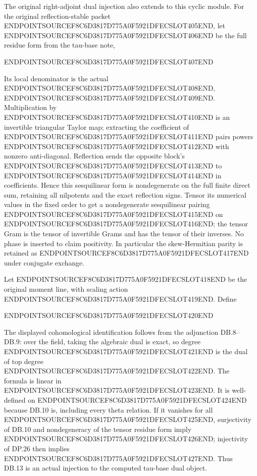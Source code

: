 The original right-adjoint dual injection also extends to this cyclic module. For the original reflection-stable packet ENDPOINTSOURCEF8C6D3817D775A0F5921DFECSLOT405END, let ENDPOINTSOURCEF8C6D3817D775A0F5921DFECSLOT406END be the full residue form from the tau-base note,

ENDPOINTSOURCEF8C6D3817D775A0F5921DFECSLOT407END

Its local denominator is the actual ENDPOINTSOURCEF8C6D3817D775A0F5921DFECSLOT408END, ENDPOINTSOURCEF8C6D3817D775A0F5921DFECSLOT409END. Multiplication by ENDPOINTSOURCEF8C6D3817D775A0F5921DFECSLOT410END is an invertible triangular Taylor map; extracting the coefficient of ENDPOINTSOURCEF8C6D3817D775A0F5921DFECSLOT411END pairs powers ENDPOINTSOURCEF8C6D3817D775A0F5921DFECSLOT412END with nonzero anti-diagonal. Reflection sends the opposite block's ENDPOINTSOURCEF8C6D3817D775A0F5921DFECSLOT413END to ENDPOINTSOURCEF8C6D3817D775A0F5921DFECSLOT414END in coefficients. Hence this sesquilinear form is nondegenerate on the full finite direct sum, retaining all nilpotents and the exact reflection signs. Tensor its numerical values in the fixed order to get a nondegenerate sesquilinear pairing ENDPOINTSOURCEF8C6D3817D775A0F5921DFECSLOT415END on ENDPOINTSOURCEF8C6D3817D775A0F5921DFECSLOT416END; the tensor Gram is the tensor of invertible Grams and has the tensor of their inverses. No phase is inserted to claim positivity. In particular the skew-Hermitian parity is retained as ENDPOINTSOURCEF8C6D3817D775A0F5921DFECSLOT417END under conjugate exchange.

Let ENDPOINTSOURCEF8C6D3817D775A0F5921DFECSLOT418END be the original moment line, with scaling action ENDPOINTSOURCEF8C6D3817D775A0F5921DFECSLOT419END. Define

ENDPOINTSOURCEF8C6D3817D775A0F5921DFECSLOT420END

The displayed cohomological identification follows from the adjunction DB.8--DB.9: over the field, taking the algebraic dual is exact, so degree ENDPOINTSOURCEF8C6D3817D775A0F5921DFECSLOT421END is the dual of top degree ENDPOINTSOURCEF8C6D3817D775A0F5921DFECSLOT422END. The formula is linear in ENDPOINTSOURCEF8C6D3817D775A0F5921DFECSLOT423END. It is well-defined on ENDPOINTSOURCEF8C6D3817D775A0F5921DFECSLOT424END because DB.10 is, including every theta relation. If it vanishes for all ENDPOINTSOURCEF8C6D3817D775A0F5921DFECSLOT425END, surjectivity of DB.10 and nondegeneracy of the tensor residue form imply ENDPOINTSOURCEF8C6D3817D775A0F5921DFECSLOT426END; injectivity of DP.26 then implies ENDPOINTSOURCEF8C6D3817D775A0F5921DFECSLOT427END. Thus DB.13 is an actual injection to the computed tau-base dual object.

